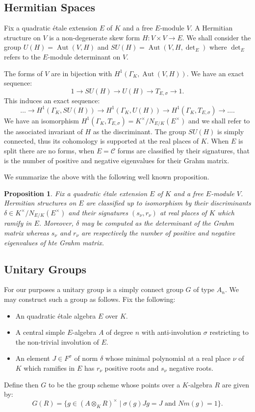 \documentclass{article}
\theoremstyle{plain}
\newtheorem{proposition}[theorem]{Proposition}
\theoremstyle{definition}
\DeclareMathOperator{\Aut}{Aut}
\newcommand{\C}{\mathcal{C}}
\newcommand{\GalKbK}{\Gamma_K}
\begin{document}
\subsection{Hermitian Spaces}

Fix a quadratic \'etale extension $E$ of $K$ and a free $E$-module $V$.
A Hermitian structure on $V$ is a non-degenerate skew form $H : V\times V \rightarrow E$.
We shall consider the group $U(H) = \Aut(V,H)$ and $SU(H) = \Aut(V,H,\det_E)$ where $\det_E$ refers to the $E$-module determinant on $V$.

The forms of $V$ are in bijection with $H^1(\GalKbK, \Aut(V,H))$.
We have an exact sequence:
\[ 1 \rightarrow SU(H) \rightarrow U(H) \rightarrow T_{E,\sigma} \rightarrow 1. \]
This induces an exact sequence:
\[ \ldots \rightarrow H^1(\GalKbK,SU(H))  \rightarrow H^1(\GalKbK,U(H))  \rightarrow H^1(\GalKbK,T_{E,\sigma}) \rightarrow \ldots. \]
We have an isomorphism $H^1(\GalKbK,T_{E,\sigma}) = K^\times/N_{E/K}(E^\times)$ and we shall refer to the associated invariant of $H$ as the discriminant.
The group $SU(H)$ is simply connected, thus its cohomology is supported at the real places of $K$.
When $E$ is split there are no forms, when $E=\C$ forms are classified by their signatures, that is the number of positive and negative eigenvalues for their Grahm matrix.

We summarize the above with the following well known proposition.
\begin{proposition}
Fix a quadratic \'etale extension $E$ of $K$ and a free $E$-module $V$.
Hermitian structures on $E$ are classified up to isomorphism by their discriminants $\delta\in K^\times/N_{E/K}(E^\times)$ and their signatures $(s_\nu,r_\nu)$ at real places of $K$ which ramify in $E$.
Moreover, $\delta$ may be computed as the determinant of the Grahm matrix whereas $s_\nu$ and $r_\nu$ are respectively the number of positive and negative eigenvalues of hte Grahm matrix.
\end{proposition}

\subsection{Unitary Groups}

For our purposes a unitary group is a simply connect group $G$ of type $A_n$.
We may construct such a group as follows.
Fix the following:
\begin{itemize}
\item An quadratic \'etale algebra $E$ over $K$.
\item A central simple $E$-algebra $A$ of degree $n$ with anti-involution $\sigma$ restricting to the non-trivial involution of $E$.
\item An element $J\in F^\sigma$ of norm $\delta$ whose minimal polynomial at a real place $\nu$ of $K$ which ramifies in $E$ has $r_\nu$ positive roots and $s_\nu$ negative roots.
\end{itemize}
Define then $G$ to be the group scheme whose points over a $K$-algebra $R$ are given by:
\[ G(R) = \{ g\in (A\otimes_K R)^\times \mid \sigma(g)Jg = J \text{ and } Nm(g) = 1 \}. \]
\end{document}
